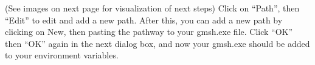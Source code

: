 \documentclass{report}
\begin{document}
\noindent (See images on next page for visualization of next steps) Click on ``Path'', then ``Edit'' to edit and add a new path. After this, you can add a new path by clicking on New, then pasting the pathway to your gmsh.exe file. Click ``OK'' then ``OK'' again in the next dialog box, and now your gmsh.exe should be added to your environment variables.

\newpage
\end{document}
